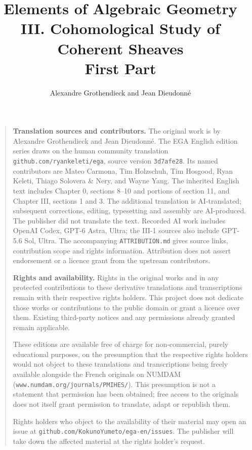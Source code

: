 \documentclass[oneside]{amsart}
\theoremstyle{ega-env-style}
\theoremstyle{ega-thm-env-style}
\theoremstyle{ega-defn-env-style}
\begin{document}
\title{Elements of Algebraic Geometry\\
III. Cohomological Study of Coherent Sheaves\\
First Part}
\author{Alexandre Grothendieck and Jean Dieudonné}
\date{}
\maketitle


\begingroup
\small
\begin{quote}
\textbf{Translation sources and contributors.}
The original work is by Alexandre Grothendieck and Jean Dieudonn\'e.
The EGA English edition series draws on the human community translation
\texttt{github.com/ryankeleti/ega}, source version \texttt{3d7afe28}.
Its named contributors are Mateo Carmona, Tim Holzschuh, Tim Hosgood,
Ryan Keleti, Thiago Solovera \& Nery, and Wayne Yang.
The inherited English text includes Chapter 0, sections 8--10 and portions of section 11, and Chapter III, sections 1 and 3.
The additional translation is AI-translated; subsequent corrections, editing,
typesetting and assembly are AI-produced. The publisher did not translate
the text. Recorded AI work includes OpenAI Codex,
GPT-6 Astra, Ultra; the III-1 sources also include GPT-5.6 Sol, Ultra.
The accompanying \texttt{ATTRIBUTION.md} gives source links, contribution
scope and rights information. Attribution does not assert endorsement
or a licence grant from the upstream contributors.

\medskip
\textbf{Rights and availability.}
Rights in the original works and in any protected contributions to these
derivative translations and transcriptions remain with their respective
rights holders. This project does not dedicate those works or contributions
to the public domain or grant a licence over them. Existing third-party
notices and any permissions already granted remain applicable.

These editions are available free of charge for non-commercial, purely
educational purposes, on the presumption that the respective rights holders
would not object to these translations and transcriptions being freely
available alongside the French originals on NUMDAM
(\texttt{www.numdam.org/journals/PMIHES/}). This presumption is not a statement
that permission has been obtained; free access to the originals does not
itself grant permission to translate, adapt or republish them.

Rights holders who object to the availability of their material may open
an issue at \texttt{github.com/KokunoYumeto/ega-en/issues}. The publisher
will take down the affected material at the rights holder's request.
\end{quote}
\endgroup
\end{document}
